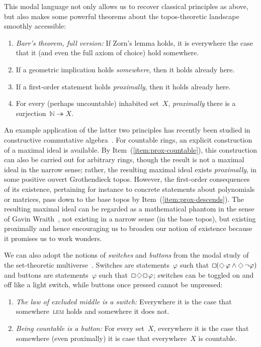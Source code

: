 \documentclass[oneside,reqno]{amsart}
\theoremstyle{definition}
\theoremstyle{plain}
\theoremstyle{remark}
\newcommand{\NN}{\mathbb{N}}
\renewcommand{\_}{\mathpunct{.}\,}
\DeclareMathOperator{\possible}{\text{\tikz[scale=.6ex/1cm,baseline=-.6ex,rotate=45,line width=.1ex]{\draw (-1,-1) rectangle (1,1);}}}
\DeclareMathOperator{\necessary}{\text{\tikz[scale=.6ex/1cm,baseline=-.6ex,line width=.1ex]{\draw (-1,-1) rectangle (1,1);}}}
\newcommand{\?}{\,{:}\,}
\begin{document}
This modal language not only allows us to recover classical principles
as above, but also makes some powerful theorems about the topos-theoretic
landscape smoothly accessible:
\begin{enumerate}
\addtocounter{enumi}{7}
\item \emph{Barr's theorem, full version:} If Zorn's lemma holds, it is
everywhere the case that it (and even the full axiom of choice) hold somewhere.
\item If a geometric implication holds \emph{somewhere}, then it holds already here.
\item \label{item:prox-descends}
If a first-order statement holds \emph{proximally}, then it holds already here.
\item \label{item:prox-countable}
For every (perhaps uncountable) inhabited set~$X$, \emph{proximally} there is a
surjection~$\NN \twoheadrightarrow X$.
\end{enumerate}
An example application of the latter two principles
has recently been studied in constructive
commutative algebra~\cite{blechschmidt-schuster:constructive-maximal-ideals}.
For countable rings, an explicit construction of a maximal ideal is available.
By Item~(\ref{item:prox-countable}), this construction can also be carried out
for arbitrary rings, though the result is not a maximal ideal in the narrow
sense; rather, the resulting maximal ideal exists \emph{proximally}, in some
positive ouvert Grothendieck topos. However, the first-order consequences of
its existence, pertaining for instance to concrete statements about polynomials
or matrices, pass down to the base topos by Item~(\ref{item:prox-descends}).
The resulting maximal ideal can be regarded as a mathematical
phantom in the sense of Gavin Wraith~\cite{xxx}, not existing in a narrow
sense (in the base topos), but existing proximally and hence encouraging us to broaden our notion of
existence because it promises us to work wonders.

We can also adopt the notions of \emph{switches} and \emph{buttons} from the
modal study of the set-theoretic multiverse~\cite[xxx]{xxx}. Switches are
statements~$\varphi$ such that~$\necessary(\possible\varphi \wedge
\possible\neg\varphi)$ and buttons are statements~$\varphi$ such
that~$\necessary\possible\necessary\varphi$; switches can be toggled on and off
like a light switch, while buttons once pressed cannot be unpressed:
\begin{enumerate}
\addtocounter{enumi}{10}
\item \emph{The law of excluded middle is a switch:} Everywhere it is the case
that somewhere~\textsc{lem} holds and somewhere it does not.
\item \emph{Being countable is a button:} For every set~$X$, everywhere it is
the case that somewhere (even proximally) it is case that everywhere~$X$ is
countable.
\end{enumerate}
\end{document}
